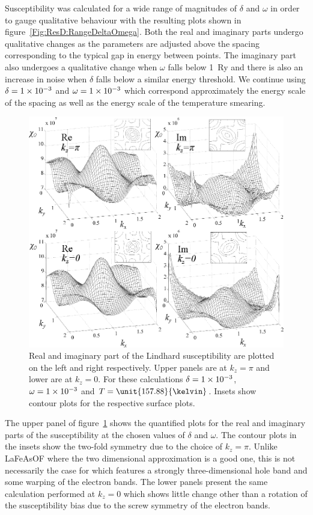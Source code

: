 Susceptibility was calculated for a wide range of magnitudes of $\delta$ and $\omega$ in order to gauge qualitative behaviour with the resulting plots shown in figure~\ref{Fig:ResD:RangeDeltaOmega}. Both the real and imaginary parts undergo qualitative changes as the parameters are adjusted above the spacing corresponding to the typical gap in energy between points. The imaginary part also undergoes a qualitative change when $\omega$ falls below \unit{1}{\textrm{Ry}} and there is also an increase in noise when $\delta$ falls below a similar energy threshold. We continue using $\delta=1\times 10^{-3}$ and $\omega=1\times 10^{-3}$ which correspond approximately the energy scale of the spacing as well as the energy scale of the temperature smearing.

\begin{figure}[htbp]
    \begin{center}
        \includegraphics[scale=0.9]{Chapter-dHvABaFe2P2/Figures/Susceptibility/2DSusceptibility/2DSusceptibilityPlusAltKz}
        \caption{Real and imaginary part of the Lindhard susceptibility are plotted on the left and right respectively. Upper panels are at $k_z=\pi$ and lower are at $k_z=0$. For these calculations $\delta=1\times 10^{-3}$, $\omega=1\times 10^{-3}$ and $T=\unit{157.88}{\kelvin}$. Insets show contour plots for the respective surface plots.}
        \label{Fig:ResD:2DSusceptibility}
    \end{center}
\end{figure}
The upper panel of figure~\ref{Fig:ResD:2DSusceptibility} shows the quantified plots for the real and imaginary parts of the susceptibility at the chosen values of $\delta$ and $\omega$. The contour plots in the insets show the two-fold symmetry due to the choice of $k_z=\pi$. Unlike LaFeAsOF where the two dimensional approximation is a good one, this is not necessarily the case for \BaFeP which features a strongly three-dimensional hole band and some warping of the electron bands. The lower panels present the same calculation performed at $k_z=0$ which shows little change other than a rotation of the susceptibility bias due to the screw symmetry of the electron bands.

